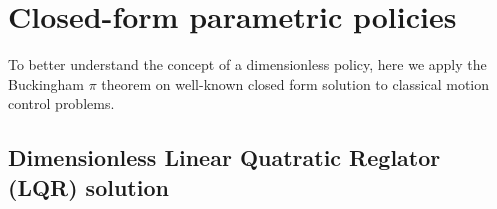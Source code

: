 \section{Closed-form parametric policies}
\label{sec:closedfrom}

To better understand the concept of a dimensionless policy, here we apply the Buckingham $\pi$ theorem on well-known closed form solution to classical motion control problems.


\subsection{ Dimensionless Linear Quatratic Reglator (LQR) solution}
\label{sec:lqr}

